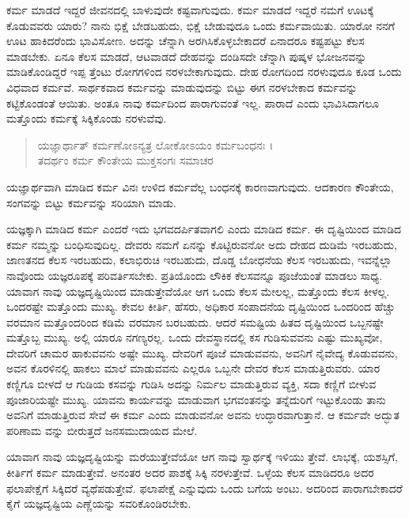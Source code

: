 ಕರ್ಮ ಮಾಡದೆ ಇದ್ದರೆ ಜೀವನದಲ್ಲಿ ಬಾಳುವುದೇ ಕಷ್ಟವಾಗುವುದು. ಕರ್ಮ ಮಾಡದೆ ಇದ್ದರೆ ನಮಗೆ ಊಟಕ್ಕೆ ಕೊಡುವವರು ಯಾರು? ನಾನು ಭಿಕ್ಷೆ ಬೇಡಬಹುದು, ಭಿಕ್ಷೆ ಬೇಡುವುದೂ ಒಂದು ಕರ್ಮವಾಯಿತು. ಯಾರೋ ನನಗೆ ಊಟ ಹಾಕಿದರೆಂದು ಭಾವಿಸೋಣ. ಅದನ್ನು ಚೆನ್ನಾಗಿ ಅರಗಿಸಿಕೊಳ್ಳಬೇಕಾದರೆ ಏನಾದರೂ ಕಷ್ಟಪಟ್ಟು ಕೆಲಸ ಮಾಡಬೇಕು. ಏನೂ ಕೆಲಸ ಮಾಡದೆ, ಆಟವಾಡದೆ ದೇಹವನ್ನು ದಂಡಿಸದೇ ಚೆನ್ನಾಗಿ ಪುಷ್ಕಳ ಭೋಜನವನ್ನು ಮಾಡಿಕೊಂಡಿದ್ದರೆ ಇಪ್ಪ ತ್ತೆಂಟು ರೋಗಗಳಿಂದ ನರಳಬೇಕಾಗುವುದು. ದೇಹ ರೋಗದಿಂದ ನರಳುವುದೂ ಕೂಡ ಒಂದು ವಿಧವಾದ ಕರ್ಮವೆ. ಸಾರ್ಥಕವಾದ ಕರ್ಮವನ್ನು ಮಾಡುವುದನ್ನು ಬಿಟ್ಟು ಈಗ ನರಳಬೇಕಾದ ಕರ್ಮವನ್ನು ಕಟ್ಟಿಕೊಂಡಂತೆ ಆಯಿತು. ಅಂತೂ ನಾವು ಕರ್ಮದಿಂದ ಪಾರಾಗುವಂತೆ ಇಲ್ಲ. ಪಾರಾದೆ ಎಂದು ಭಾವಿಸಿದಾಗಲೂ ಮತ್ತೊಂದು ಕರ್ಮಕ್ಕೆ ಸಿಕ್ಕಿಕೊಂಡು ನರಳುವೆವು.

\begin{verse}
ಯಜ್ಞಾರ್ಥಾತ್ ಕರ್ಮಣೋಽನ್ಯತ್ರ ಲೋಕೋಽಯಂ ಕರ್ಮಬಂಧನಃ ।\\ತದರ್ಥಂ ಕರ್ಮ ಕೌಂತೇಯ ಮುಕ್ತಸಂಗಃ ಸಮಾಚರ 
\end{verse}

{\small ಯಜ್ಞಾರ್ಥವಾಗಿ ಮಾಡಿದ ಕರ್ಮ ವಿನಃ ಉಳಿದ ಕರ್ಮವೆಲ್ಲ ಬಂಧನಕ್ಕೆ ಕಾರಣವಾಗುವುದು. ಆದಕಾರಣ ಕೌಂತೇಯ, ಸಂಗವನ್ನು ಬಿಟ್ಟು ಕರ್ಮವನ್ನು ಸರಿಯಾಗಿ ಮಾಡು.}

ಯಜ್ಞಕ್ಕಾಗಿ ಮಾಡಿದ ಕರ್ಮ ಎಂದರೆ ಇದು ಭಗವದರ್ಪಿತವಾಗಲಿ ಎಂದು ಮಾಡಿದ ಕರ್ಮ. ಈ ದೃಷ್ಟಿಯಿಂದ ಮಾಡಿದ ಕರ್ಮ ನಮ್ಮನ್ನು ಬಂಧಿಸುವುದಿಲ್ಲ. ದೇವರು ನಮಗೆ ಏನನ್ನು ಕೊಟ್ಟಿರುವನೋ ಅದು ದೇಹದ ದುಡಿಮೆ ಇರಬಹುದು, ಜಾಣತನದ ಕೆಲಸ ಇರಬಹುದು, ಕಲಾಭಿರುಚಿ ಇರಬಹುದು, ದೊಡ್ಡ ಬೋಧನೆಯ ಕೆಲಸ ಇರಬಹುದು, ಇವನ್ನೆಲ್ಲಾ ನಾವೊಂದು ಯಜ್ಞರೂಪಕ್ಕೆ ಪರಿವರ್ತಿಸಬೇಕು. ಪ್ರತಿಯೊಂದು ಲೌಕಿಕ ಕೆಲಸವನ್ನೂ ಪೂಜೆಯಂತೆ ಮಾಡಲು ಸಾಧ್ಯ. ಯಾವಾಗ ನಾವು ಯಜ್ಞದೃಷ್ಟಿಯಿಂದ ಮಾಡುತ್ತೇವೆಯೋ ಆಗ ಒಂದು ಕೆಲಸ ಮೇಲಲ್ಲ, ಮತ್ತೊಂದು ಕೆಲಸ ಕೀಳಲ್ಲ. ಒಂದರಷ್ಟೇ ಮತ್ತೊಂದು ಮುಖ್ಯ. ಕೇವಲ ಕೀರ್ತಿ, ಹೆಸರು, ಅಧಿಕಾರ ಸಂಪಾದನೆಯ ದೃಷ್ಟಿಯಿಂದ ಒಂದರಿಂದ ಹೆಚ್ಚು ವರಮಾನ ಮತ್ತೊಂದರಿಂದ ಕಡಿಮೆ ವರಮಾನ ಬರಬಹುದು. ಆದರೆ ಸಮಷ್ಟಿಯ ಹಿತದ ದೃಷ್ಟಿಯಿಂದ ಒಬ್ಬನಷ್ಟೇ ಮತ್ತೊಬ್ಬ ಮುಖ್ಯ. ಅಲ್ಲಿ ಯಾರೂ ನಗಣ್ಯರಲ್ಲ. ಒಂದು ದೇವಸ್ಥಾನದಲ್ಲಿ ಕಸ ಗುಡಿಸುವವನು ಎಷ್ಟು ಮುಖ್ಯವೋ, ದೇವರಿಗೆ ಚಾಮರ ಹಾಕುವವನು ಅಷ್ಟೇ ಮುಖ್ಯ. ದೇವರಿಗೆ ಪೂಜೆ ಮಾಡುವವನು, ಅವನಿಗೆ ನೈವೇದ್ಯ ಕೊಡುವವನು, ಅವನ ಕೊರಳಿನಲ್ಲಿ ಹಾಕಲು ಮಾಲೆ ಮಾಡುವವನು ಎಲ್ಲರೂ ಒಬ್ಬನೇ ದೇವರ ಕೆಲಸ ಮಾಡುತ್ತಿರುವರು. ಯಾರ ಕಣ್ಣಿಗೂ ಬೀಳದೆ ಆ ಗುಡಿಯ ಕಸವನ್ನು ಗುಡಿಸಿ ಅದನ್ನು ನಿರ್ಮಲ ಮಾಡುತ್ತಿರುವ ವ್ಯಕ್ತಿ, ಸದಾ ಕಣ್ಣಿಗೆ ಬೀಳುವ ಪೂಜಾರಿಯಷ್ಟೇ ಮುಖ್ಯ. ಯಾವನು ಕಾರ್ಯವನ್ನು ಮಾಡುವಾಗ ಭಗವಂತನನ್ನು ತನ್ನೆದುರಿಗೆ ಇಟ್ಟುಕೊಂಡು ತಾನು ಅವನಿಗೆ ಮಾಡುತ್ತಿರುವ ಸೇವೆ ಈ ಕರ್ಮ ಎಂದು ಮಾಡುವನೋ ಅವನು ಉದ್ಧಾರವಾಗುತ್ತಾನೆ. ಆ ಕರ್ಮವೇ ಅದ್ಭುತ ಪರಿಣಾಮ ವನ್ನು ಬೀರುತ್ತದೆ ಜನಸಮುದಾಯದ ಮೇಲೆ.

ಯಾವಾಗ ನಾವು ಯಜ್ಞದೃಷ್ಟಿಯನ್ನು ಮರೆಯುತ್ತೇವೆಯೋ ಆಗ ನಾವು ಸ್ವಾರ್ಥಕ್ಕೆ ಇಳಿಯು ತ್ತೇವೆ. ಲಾಭಕ್ಕೆ, ಯಶಸ್ಸಿಗೆ, ಕೀರ್ತಿಗೆ ಕರ್ಮ ಮಾಡುತ್ತೇವೆ. ಅನಂತರ ಅದರ ಪಾಶಕ್ಕೆ ಸಿಕ್ಕಿ ನರಳುತ್ತೇವೆ. ಒಳ್ಳೆಯ ಕೆಲಸ ಮಾಡಿದರೂ ಅದರ ಫಲಾಪೇಕ್ಷೆಗೆ ಸಿಕ್ಕಿದರೆ ವ್ಯಥೆಪಡುತ್ತೇವೆ. ಫಲಾಪೇಕ್ಷೆ ಎನ್ನುವುದು ಒಂದು ಬಗೆಯ ಅಂಟು. ಅದರಿಂದ ಪಾರಾಗಬೇಕಾದರೆ ಕೈಗೆ ಯಜ್ಞದೃಷ್ಟಿಯ ಎಣ್ಣೆಯನ್ನು ಸವರಿಕೊಂಡಿರಬೇಕು.

